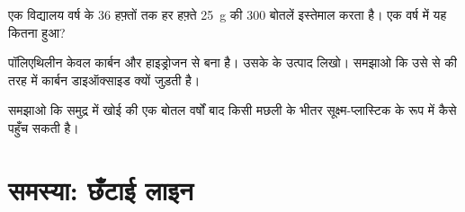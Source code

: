 \begin{exercise}[$\star\star$]\label{exo:g8:plastics:10}
एक विद्यालय वर्ष के 36 हफ़्तों तक हर हफ़्ते \qty{25}{g} की 300 बोतलें
इस्तेमाल करता है। एक वर्ष में यह कितना  हुआ?
\end{exercise}

\begin{exercise}[$\star\star\star$]\label{exo:g8:plastics:11}
पॉलिएथिलीन केवल कार्बन और हाइड्रोजन से बना है। उसके  के उत्पाद
लिखो। समझाओ कि उसे  से  की तरह  में कार्बन डाइऑक्साइड
क्यों जुड़ती है।
\end{exercise}

\begin{exercise}[$\star\star\star$]\label{exo:g8:plastics:12}
समझाओ कि समुद्र में खोई  की एक बोतल वर्षों बाद किसी मछली के भीतर
सूक्ष्म-प्लास्टिक के रूप में कैसे पहुँच सकती है।
\end{exercise}

\section{समस्या: छँटाई लाइन}

